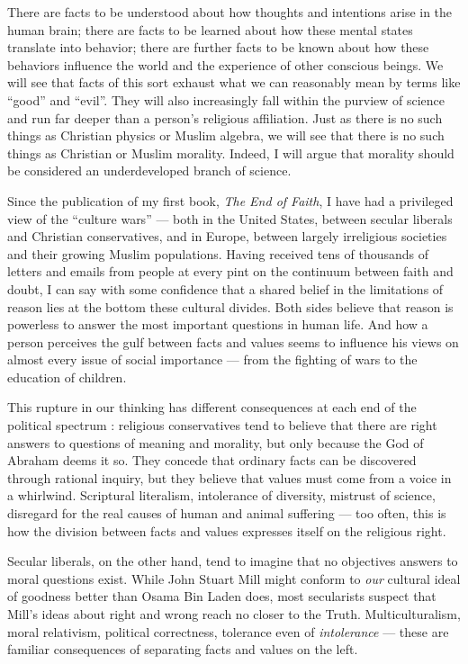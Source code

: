 \documentclass[a4paper,14pt]{extarticle}
\begin{document}
There are facts to be understood about how thoughts and intentions arise in the human brain;
there are facts to be learned about how these mental states translate into behavior;
there are further facts to be known about how these behaviors influence the world and the experience of other conscious beings.
We will see that facts of this sort exhaust what we can reasonably mean by terms like ``good'' and ``evil''.
They will also increasingly fall within the purview of science and run far deeper than a person's religious affiliation.
Just as there is no such things as Christian physics or Muslim algebra, we will see that there is no such things as Christian or Muslim morality.
Indeed, I will argue that morality should be considered an underdeveloped branch of science.

Since the publication of my first book, \textit{The End of Faith}, I have had a privileged view of the ``culture wars'' --- both in the United States, between secular liberals and Christian conservatives, and in Europe, between largely irreligious societies and their growing Muslim populations.
Having received tens of thousands of letters and emails from people at every pint on the continuum between faith and doubt, I can say with some confidence that a shared belief in the limitations of reason lies at the bottom these cultural divides.
Both sides believe that reason is powerless to answer the most important questions in human life.
And how a person perceives the gulf between facts and values seems to influence his views on almost every issue of social importance --- from the fighting of wars to the education of children.

This rupture in our thinking has different consequences at each end of the political spectrum :
religious conservatives tend to believe that there are right answers to questions of meaning and morality, but only because the God of Abraham deems it so.
They concede that ordinary facts can be discovered through rational inquiry, but they believe that values must come from a voice in a whirlwind.
Scriptural literalism, intolerance of diversity, mistrust of science, disregard for the real causes of human and animal suffering --- too often, this is how the division between facts and values expresses itself on the religious right.

Secular liberals, on the other hand, tend to imagine that no objectives answers to moral questions exist.
While John Stuart Mill might conform to \textit{our} cultural ideal of goodness better than Osama Bin Laden does, most secularists suspect that Mill's ideas about right and wrong reach no closer to the Truth.
Multiculturalism, moral relativism, political correctness, tolerance even of \textit{intolerance} --- these are familiar consequences of separating facts and values on the left.
\end{document}
